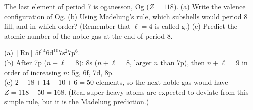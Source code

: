 The last element of period 7 is oganesson, Og ($Z = 118$). (a) Write the valence configuration of
Og. (b) Using Madelung's rule, which subshells would period 8 fill, and in which order? (Remember that
$\ell = 4$ is called g.) (c) Predict the atomic number of the noble gas at the end of period 8.
\begin{solution}
(a) $[\mathrm{Rn}]\,5\mathrm f^{14} 6\mathrm d^{10} 7\mathrm s^2 7\mathrm p^6$.\\
(b) After 7p ($n+\ell = 8$): 8s ($n+\ell = 8$, larger $n$ than 7p), then $n+\ell = 9$ in order of
increasing $n$: 5g, 6f, 7d, 8p.\\
(c) $2 + 18 + 14 + 10 + 6 = 50$ elements, so the next noble gas would have $Z = 118 + 50 = 168$.
(Real super-heavy atoms are expected to deviate from this simple rule, but it is the Madelung
prediction.)
\end{solution}
